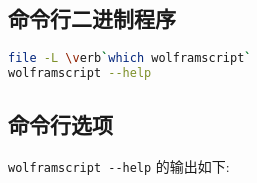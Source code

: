 
\begin{issues}
\issueDraft
\issueTODO
\end{issues}

\subsection{命令行二进制程序}

\begin{lstlisting}[language=bash]
file -L \verb`which wolframscript`
wolframscript --help
\end{lstlisting}

\subsection{命令行选项} 

\verb`wolframscript --help` 的输出如下:

